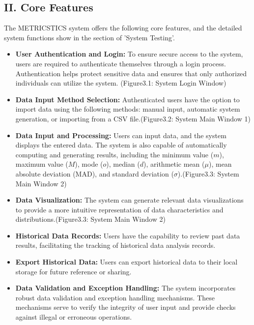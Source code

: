 \documentclass[english,12pt,a4paper]{report}
\begin{document}
	\subsection*{II. Core Features}
	
	The METRICSTICS system offers the following core features, and the detailed system functions show in the section of 'System Testing'.  
	\begin{itemize}[leftmargin=*]
		
		\item \textbf{User Authentication and Login:} To ensure secure access to the system, users are required to authenticate themselves through a login process. Authentication helps protect sensitive data and ensures that only authorized individuals can utilize the system.	(Figure3.1: System Login Window)
		
		\item \textbf{Data Input Method Selection:} Authenticated users have the option to import data using the following methods: manual input, automatic system generation, or importing from a CSV file.(Figure3.2: System Main Window 1)
		
		\item \textbf{Data Input and Processing:} Users can input data, and the system displays the entered data. The system is also capable of automatically computing and generating results, including the minimum value ($m$), maximum value ($M$), mode ($o$), median ($d$), arithmetic mean ($\mu$), mean absolute deviation (MAD), and standard deviation ($\sigma$).(Figure3.3: System Main Window 2)
		
		\item \textbf{Data Visualization:} The system can generate relevant data visualizations to provide a more intuitive representation of data characteristics and distributions.(Figure3.3: System Main Window 2)
		
		\item \textbf{Historical Data Records:} Users have the capability to review past data results, facilitating the tracking of historical data analysis records.
		
		\item \textbf{Export Historical Data:} Users can export historical data to their local storage for future reference or sharing.
		
		\item \textbf{Data Validation and Exception Handling:} The system incorporates robust data validation and exception handling mechanisms. These mechanisms serve to verify the integrity of user input and provide checks against illegal or erroneous operations.
	\end{itemize}
\end{document}

